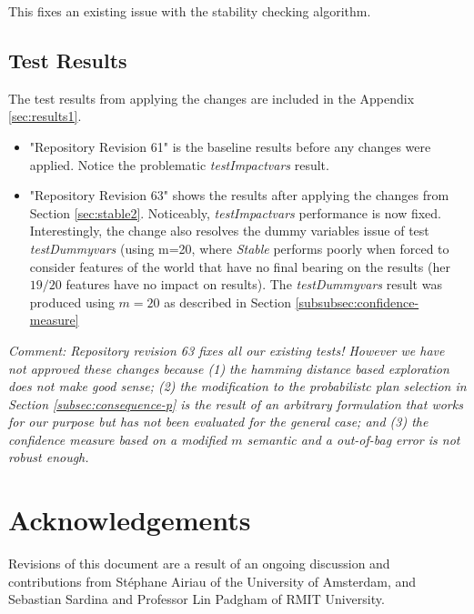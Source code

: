 \documentclass[a4paper]{article}
\newcommand{\st}{\emph{Stable}\xspace}
\newcommand{\tiv}{\emph{testImpactvars}\xspace}
\newcommand{\stephane}{{St\'ephane}\xspace}
\begin{document}
This fixes an existing issue with the stability checking algorithm.

\subsection{Test Results}
The test results from applying the changes are included in the Appendix \ref{sec:results1}.
\begin{itemize}
\item "Repository Revision 61" is the baseline results before any changes were applied. Notice the problematic \tiv result.
\item "Repository Revision 63" shows the results after applying the changes from Section \ref{sec:stable2}. Noticeably, \tiv performance is now fixed. Interestingly, the change also resolves the dummy variables issue of test \textit{testDummyvars} (using m=20, where \st performs poorly when forced to consider features of the world that have no final bearing on the results (her $19/20$ features have no impact on results). The \textit{testDummyvars} result was produced using $m=20$ as described in Section \ref{subsubsec:confidence-measure}
\end{itemize}

\textit{Comment: Repository revision 63 fixes all our existing tests! However we have not approved these changes because (1) the hamming distance based exploration does not make good sense; (2) the modification to the probabilistc plan selection in Section \ref{subsec:consequence-p} is the result of an arbitrary formulation that works for our purpose but has not been evaluated for the general case; and (3) the confidence measure based on a modified $m$ semantic and a out-of-bag error is not robust enough. }



\section{Acknowledgements}

Revisions of this document are a result of an ongoing discussion and contributions from \stephane Airiau of the University of Amsterdam, and Sebastian Sardina and Professor Lin Padgham of RMIT University.
\end{document}
